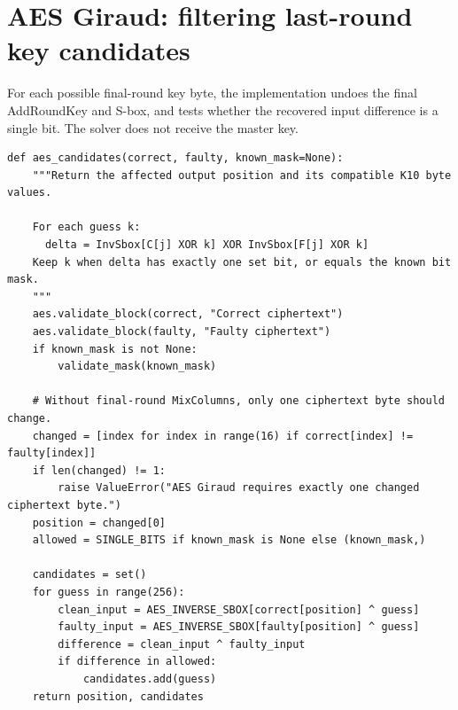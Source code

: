 \documentclass[11pt,a4paper]{report}
\begin{document}
\section{AES Giraud: filtering last-round key candidates}
For each possible final-round key byte, the implementation undoes the final AddRoundKey and S-box, and tests whether the recovered input difference is a single bit. The solver does not receive the master key.
\begin{lstlisting}[style=pycode,caption={AES Giraud candidate test, from giraud.py}]
def aes_candidates(correct, faulty, known_mask=None):
    """Return the affected output position and its compatible K10 byte values.

    For each guess k:
      delta = InvSbox[C[j] XOR k] XOR InvSbox[F[j] XOR k]
    Keep k when delta has exactly one set bit, or equals the known bit mask.
    """
    aes.validate_block(correct, "Correct ciphertext")
    aes.validate_block(faulty, "Faulty ciphertext")
    if known_mask is not None:
        validate_mask(known_mask)

    # Without final-round MixColumns, only one ciphertext byte should change.
    changed = [index for index in range(16) if correct[index] != faulty[index]]
    if len(changed) != 1:
        raise ValueError("AES Giraud requires exactly one changed ciphertext byte.")
    position = changed[0]
    allowed = SINGLE_BITS if known_mask is None else (known_mask,)

    candidates = set()
    for guess in range(256):
        clean_input = AES_INVERSE_SBOX[correct[position] ^ guess]
        faulty_input = AES_INVERSE_SBOX[faulty[position] ^ guess]
        difference = clean_input ^ faulty_input
        if difference in allowed:
            candidates.add(guess)
    return position, candidates
\end{lstlisting}
\end{document}
